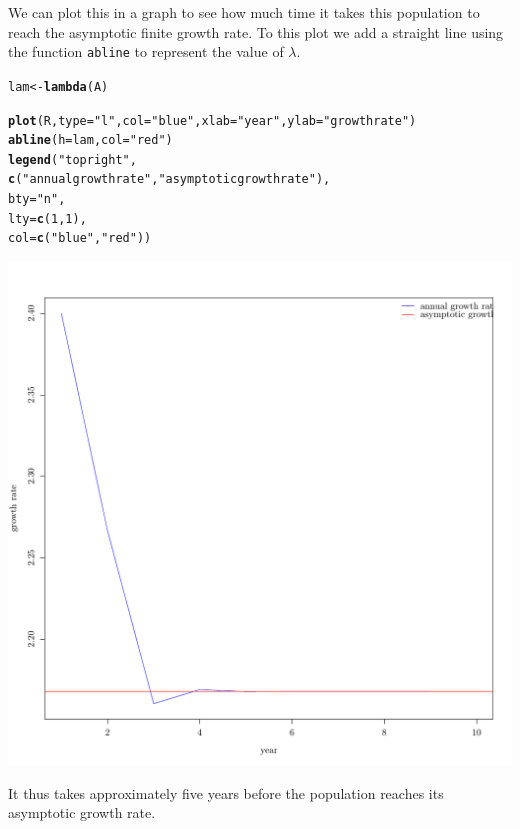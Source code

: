\documentclass{article}\usepackage[]{graphicx}\usepackage[]{color}
\makeatletter
\def\maxwidth{ %
  \ifdim\Gin@nat@width>\linewidth
    \linewidth
  \else
    \Gin@nat@width
  \fi
}
\newcommand{\hlnum}[1]{\textcolor[rgb]{0.686,0.059,0.569}{#1}}%
\newcommand{\hlstr}[1]{\textcolor[rgb]{0.192,0.494,0.8}{#1}}%
\newcommand{\hlstd}[1]{\textcolor[rgb]{0.345,0.345,0.345}{#1}}%
\newcommand{\hlkwb}[1]{\textcolor[rgb]{0.69,0.353,0.396}{#1}}%
\newcommand{\hlkwc}[1]{\textcolor[rgb]{0.333,0.667,0.333}{#1}}%
\newcommand{\hlkwd}[1]{\textcolor[rgb]{0.737,0.353,0.396}{\textbf{#1}}}%
\newenvironment{kframe}{%
 \def\at@end@of@kframe{}%
 \ifinner\ifhmode%
  \def\at@end@of@kframe{\end{minipage}}%
  \begin{minipage}{\columnwidth}%
 \fi\fi%
 \def\FrameCommand##1{\hskip\@totalleftmargin \hskip-\fboxsep
 \colorbox{shadecolor}{##1}\hskip-\fboxsep
     \hskip-\linewidth \hskip-\@totalleftmargin \hskip\columnwidth}%
 \MakeFramed {\advance\hsize-\width
   \@totalleftmargin\z@ \linewidth\hsize
   \@setminipage}}%
 {\par\unskip\endMakeFramed%
 \at@end@of@kframe}
\makeatother
\begin{document}
We can plot this in a graph to see how much time it takes this population to reach the asymptotic finite  growth rate. To this plot we add a straight line using the function \texttt{abline} to represent the value of $\lambda$.

\begin{kframe}
\begin{alltt}
\hlstd{lam}\hlkwb{<-}\hlkwd{lambda}\hlstd{(A)}

\hlkwd{plot}\hlstd{(R,} \hlkwc{type}\hlstd{=}\hlstr{"l"}\hlstd{,} \hlkwc{col}\hlstd{=}\hlstr{"blue"}\hlstd{,} \hlkwc{xlab}\hlstd{=}\hlstr{"year"}\hlstd{,} \hlkwc{ylab}\hlstd{=}\hlstr{"growth rate"}\hlstd{)}
\hlkwd{abline}\hlstd{(}\hlkwc{h}\hlstd{=lam,} \hlkwc{col}\hlstd{=}\hlstr{"red"}\hlstd{)}
\hlkwd{legend}\hlstd{(}\hlstr{"topright"}\hlstd{,}
       \hlkwd{c}\hlstd{(}\hlstr{"annual growth rate"}\hlstd{,}\hlstr{"asymptotic growth rate"}\hlstd{),}
       \hlkwc{bty} \hlstd{=} \hlstr{"n"}\hlstd{,}
\hlkwc{lty}\hlstd{=}\hlkwd{c}\hlstd{(}\hlnum{1}\hlstd{,}\hlnum{1}\hlstd{),}
\hlkwc{col}\hlstd{=}\hlkwd{c}\hlstd{(}\hlstr{"blue"}\hlstd{,} \hlstr{"red"}\hlstd{))}
\end{alltt}
\end{kframe}
\includegraphics[width=\maxwidth]{figure/t17-1} 

It thus takes approximately five years before the population reaches its asymptotic growth rate.
\end{document}
